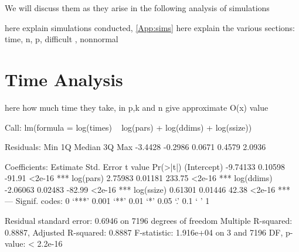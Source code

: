 We will discuss them as they arise in the following analysis of simulations

here explain simulations conducted, \ref{App:sims}
here explain the various sections: time, n, p, difficult , nonnormal 

\section{Time Analysis}

here how much time they take, in p,k and n give approximate O(x) value

\begin{Schunk}
\begin{Soutput}
Call:
lm(formula = log(times) ~ log(pars) + log(ddims) + log(ssize))

Residuals:
    Min      1Q  Median      3Q     Max 
-3.4428 -0.2986  0.0671  0.4579  2.0936 

Coefficients:
            Estimate Std. Error t value Pr(>|t|)    
(Intercept) -9.74133    0.10598  -91.91   <2e-16 ***
log(pars)    2.75983    0.01181  233.75   <2e-16 ***
log(ddims)  -2.06063    0.02483  -82.99   <2e-16 ***
log(ssize)   0.61301    0.01446   42.38   <2e-16 ***
---
Signif. codes:  0 ‘***’ 0.001 ‘**’ 0.01 ‘*’ 0.05 ‘.’ 0.1 ‘ ’ 1

Residual standard error: 0.6946 on 7196 degrees of freedom
Multiple R-squared:  0.8887,	Adjusted R-squared:  0.8887 
F-statistic: 1.916e+04 on 3 and 7196 DF,  p-value: < 2.2e-16
\end{Soutput}
\end{Schunk}

